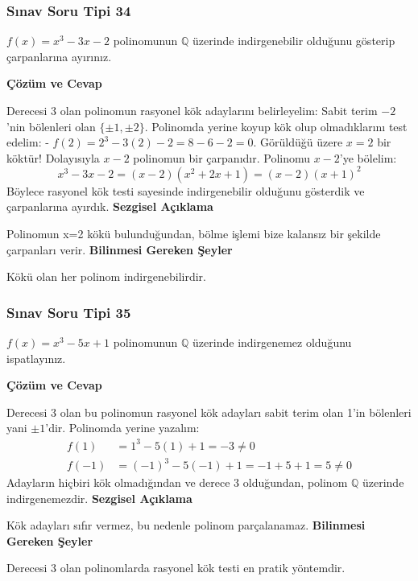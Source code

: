 \documentclass[11pt, a4paper]{article}
\newenvironment{cozum}{
    \vspace{0.5cm}
    \noindent\textcolor{green!60!black}{\faCheckCircle\enspace \textbf{\Large Çözüm ve Cevap}}\par\vspace{0.2cm}
}{}
\newenvironment{sezgisel}{
    \vspace{0.5cm}
    \noindent\textcolor{orange!80!black}{\faLightbulb\enspace \textbf{\Large Sezgisel Açıklama}}\par\vspace{0.2cm}
    \itshape
}{}
\newenvironment{bilgi}{
    \vspace{0.5cm}
    \noindent\textcolor{red!70!black}{\faExclamationTriangle\enspace \textbf{\Large Bilinmesi Gereken Şeyler}}\par\vspace{0.2cm}
}{}
\begin{document}
\subsubsection{Sınav Soru Tipi 34}
\begin{sinavbox}
$f(x) = x^3-3x-2$ polinomunun $\mathbb{Q}$ üzerinde indirgenebilir olduğunu gösterip çarpanlarına ayırınız.
\end{sinavbox}
\begin{cozum}
Derecesi 3 olan polinomun rasyonel kök adaylarını belirleyelim: Sabit terim $-2$'nin bölenleri olan $\{\pm 1, \pm 2\}$.
Polinomda yerine koyup kök olup olmadıklarını test edelim:
- $f(2) = 2^3-3(2)-2 = 8-6-2 = 0$.
Görüldüğü üzere $x=2$ bir köktür! Dolayısıyla $x-2$ polinomun bir çarpanıdır.
Polinomu $x-2$'ye bölelim:
\[ x^3-3x-2 = (x-2)(x^2+2x+1) = (x-2)(x+1)^2 \]
Böylece rasyonel kök testi sayesinde indirgenebilir olduğunu gösterdik ve çarpanlarına ayırdık.
\end{cozum}
\begin{sezgisel}
Polinomun x=2 kökü bulunduğundan, bölme işlemi bize kalansız bir şekilde çarpanları verir.
\end{sezgisel}
\begin{bilgi}
Kökü olan her polinom indirgenebilirdir.
\end{bilgi}

\newpage
\subsubsection{Sınav Soru Tipi 35}
\begin{sinavbox}
$f(x) = x^3-5x+1$ polinomunun $\mathbb{Q}$ üzerinde indirgenemez olduğunu ispatlayınız.
\end{sinavbox}
\begin{cozum}
Derecesi 3 olan bu polinomun rasyonel kök adayları sabit terim olan 1'in bölenleri yani $\pm 1$'dir.
Polinomda yerine yazalım:
\begin{align*}
f(1) &= 1^3 - 5(1) + 1 = -3 \neq 0 \\
f(-1) &= (-1)^3 - 5(-1) + 1 = -1 + 5 + 1 = 5 \neq 0
\end{align*}
Adayların hiçbiri kök olmadığından ve derece 3 olduğundan, polinom $\mathbb{Q}$ üzerinde indirgenemezdir.
\end{cozum}
\begin{sezgisel}
Kök adayları sıfır vermez, bu nedenle polinom parçalanamaz.
\end{sezgisel}
\begin{bilgi}
Derecesi 3 olan polinomlarda rasyonel kök testi en pratik yöntemdir.
\end{bilgi}
\end{document}
